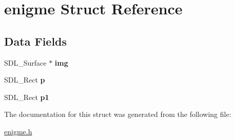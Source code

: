 \hypertarget{structenigme}{}\section{enigme Struct Reference}
\label{structenigme}
\subsection*{Data Fields}
\begin{DoxyCompactItemize}
\item 
\mbox{\label{structenigme_ac5c2141e5f8c366ff16d1fad83ee3e54}} 
S\+D\+L\+\_\+\+Surface $\ast$ {\bfseries img}
\item 
\mbox{\label{structenigme_a1ecc3fa572d2c308e1aecacf74fd1ec0}} 
S\+D\+L\+\_\+\+Rect {\bfseries p}
\item 
\mbox{\label{structenigme_af245f2d56c49deba6bc6db26d9cb4ce2}} 
S\+D\+L\+\_\+\+Rect {\bfseries p1}
\end{DoxyCompactItemize}


The documentation for this struct was generated from the following file\+:\begin{DoxyCompactItemize}
\item 
\hyperlink{enigme_8h}{enigme.\+h}\end{DoxyCompactItemize}
